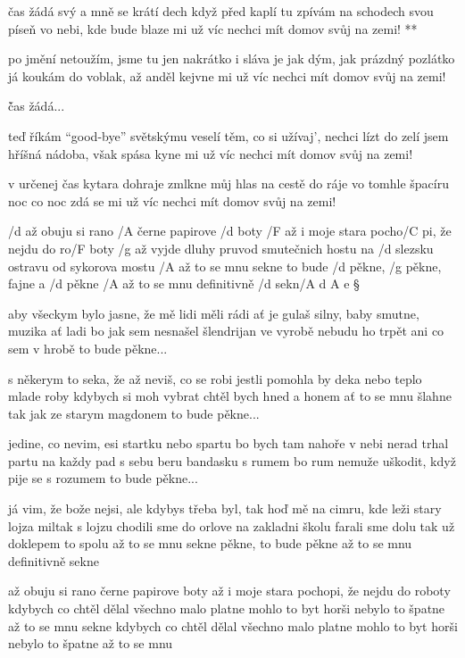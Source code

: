 \R  čas žádá svý a mně se krátí dech
    když před kaplí tu zpívám na schodech
    svou píseň vo nebi, kde bude blaze mi
    už víc nechci mít domov svůj na zemi! **

po jmění netoužím, jsme tu jen nakrátko
i sláva je jak dým, jak prázdný pozlátko
já koukám do voblak, až anděl kejvne mi
už víc nechci mít domov svůj na zemi!

\r čas žádá...

teď říkám ``good-bye'' světskýmu veselí
těm, co si užívaj', nechci lízt do zelí
jsem hříšná nádoba, však spása kyne mi
už víc nechci mít domov svůj na zemi!

\rr

v určenej čas kytara dohraje
zmlkne můj hlas na cestě do ráje
vo tomhle špacíru noc co noc zdá se mi
už víc nechci mít domov svůj na zemi!

\rr




/d až obuju si rano /A černe papirove /d boty
/F až i moje stara pocho/C pi, že nejdu do ro/F boty
/g až vyjde dluhy pruvod smutečnich hostu
na /d slezsku ostravu od sykorova mostu
/A až to se mnu sekne
to bude /d pěkne, /g pěkne, fajne a /d pěkne
/A až to se mnu definitivně /d sekn/{A d A} e \S

aby všeckym bylo jasne, že mě lidi měli rádi
ať je gulaš silny, baby smutne, muzika ať ladi
bo jak sem nesnašel šlendrijan ve vyrobě
nebudu ho trpět ani co sem v hrobě
to bude pěkne... \s

s někerym to seka, že až neviš, co se robi
jestli pomohla by deka nebo teplo mlade roby
kdybych si moh vybrat chtěl bych hned a honem
ať to se mnu šlahne tak jak ze starym magdonem
to bude pěkne... \s

jedine, co nevim, esi startku nebo spartu
bo bych tam nahoře v nebi nerad trhal partu
na každy pad s sebu beru bandasku s rumem
bo rum nemuže uškodit, když pije se s rozumem
to bude pěkne... \s

já vim, že bože nejsi, ale kdybys třeba byl, tak
hoď mě na cimru, kde leži stary lojza miltak
s lojzu chodili sme do orlove na zakladni školu
farali sme dolu tak už doklepem to spolu
až to se mnu sekne
pěkne, to bude pěkne
až to se mnu definitivně sekne \s

až obuju si rano černe papirove boty
až i moje stara pochopi, že nejdu do roboty
kdybych co chtěl dělal všechno malo platne
mohlo to byt horši nebylo to špatne
až to se mnu sekne
kdybych co chtěl dělal všechno malo platne
mohlo to byt horši nebylo to špatne
až to se mnu \s

